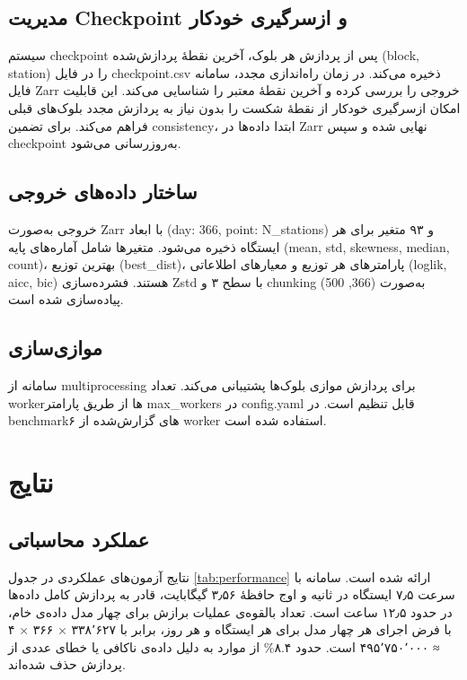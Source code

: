 \documentclass[12pt,a4paper,twocolumn]{article}
\begin{document}
\subsection{مدیریت Checkpoint و ازسرگیری خودکار}
سیستم checkpoint پس از پردازش هر بلوک، آخرین نقطهٔ پردازش‌شده (block, station) را در فایل checkpoint.csv ذخیره می‌کند. در زمان راه‌اندازی مجدد، سامانه فایل Zarr خروجی را بررسی کرده و آخرین نقطهٔ معتبر را شناسایی می‌کند. این قابلیت امکان ازسرگیری خودکار از نقطهٔ شکست را بدون نیاز به پردازش مجدد بلوک‌های قبلی فراهم می‌کند. برای تضمین consistency، ابتدا داده‌ها در Zarr نهایی شده و سپس checkpoint به‌روزرسانی می‌شود.

\subsection{ساختار داده‌های خروجی}
خروجی به‌صورت Zarr با ابعاد (day: 366, point: N\_stations) و ۹۳ متغیر برای هر ایستگاه ذخیره می‌شود. متغیرها شامل آماره‌های پایه (mean, std, skewness, median, count)، بهترین توزیع (best\_dist)، پارامترهای هر توزیع و معیارهای اطلاعاتی (loglik, aicc, bic) هستند. فشرده‌سازی Zstd با سطح ۳ و chunking به‌صورت (366, 500) پیاده‌سازی شده است.

\subsection{موازی‌سازی}
سامانه از multiprocessing برای پردازش موازی بلوک‌ها پشتیبانی می‌کند. تعداد workerها از طریق پارامتر max\_workers در config.yaml قابل تنظیم است. در benchmarkهای گزارش‌شده از ۶ worker استفاده شده است.

\section{نتایج}

\subsection{عملکرد محاسباتی}
نتایج آزمون‌های عملکردی در جدول \ref{tab:performance} ارائه شده است. سامانه با سرعت ۷٫۵ ایستگاه در ثانیه و اوج حافظهٔ ۳٫۵۶ گیگابایت، قادر به پردازش کامل داده‌ها در حدود ۱۲٫۵ ساعت است. تعداد بالقوه‌ی عملیات برازش برای چهار مدل داده‌ی خام، با فرض اجرای هر چهار مدل برای هر ایستگاه و هر روز، برابر با ۳۳۸٬۶۲۷ × ۳۶۶ × ۴ ≈ ۴۹۵٬۷۵۰٬۰۰۰ است. حدود ۸.۴\% از موارد به دلیل داده‌ی ناکافی یا خطای عددی از پردازش حذف شده‌اند.
\end{document}
